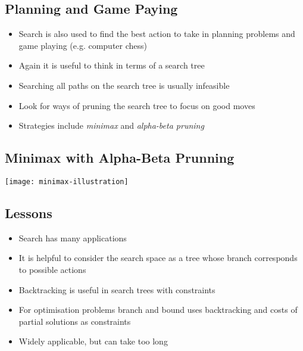 
\begin{slide}
\section{Planning and Game Paying}

\begin{PauseHighLight}
  \begin{itemize}
  \item Search is also used to find the best action to take in planning
    problems and game playing (e.g. computer chess)\pause
  \item Again it is useful to think in terms of a search tree\pause
  \item Searching all paths on the search tree is usually infeasible\pause
  \item Look for ways of pruning the search tree to focus on good moves\pause
  \item Strategies include \textit{minimax} and \textit{alpha-beta
      pruning}\pause
  \end{itemize}
\end{PauseHighLight}

\end{slide}


\begin{slide}
\section[-2]{Minimax with Alpha-Beta Prunning}

\begin{center}
  \texttt{[image: minimax-illustration]}
\end{center}
\end{slide}



\begin{slide}
\section{Lessons}

\begin{PauseHighLight}
  \begin{itemize}
  \item Search has many applications\pause
  \item It is helpful to consider the search space as a tree whose
    branch corresponds to possible actions\pause
  \item Backtracking is useful in search trees with constraints\pause
  \item For optimisation problems branch and bound uses backtracking and
    costs of partial solutions as constraints\pause
  \item Widely applicable, but can take too long\pause
  \end{itemize}
\end{PauseHighLight}

\end{slide}
